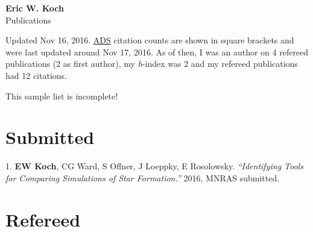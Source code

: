 \documentclass[letterpaper,11pt]{article}
\newcommand{\myname}{Eric W. Koch}
\newcommand{\mysite}{e-koch.github.io}
\newenvironment{publist}{
  \begingroup
  \raggedright
  \begin{description}[leftmargin=4ex,style=sameline]
}{
  \end{description}
  \endgroup
}
\begin{document}
\pagestyle{fancy}
\lhead{} \chead{} \rhead{} \renewcommand{\headrule}{\relax}
\cfoot{\thepage/\pageref*{LastPage}}
\rfoot{\textsc{\myname}}

\begin{center}
\textbf{\Large \myname} \\
{\large Publications}
\end{center}



\noindent Updated %
Nov 16, 2016.
\href{http://labs.adsabs.harvard.edu/adsabs}{ADS} citation counts are shown in square brackets and were last updated
around Nov 17, 2016. As of then, I was an author on 4
refereed publications (2 as first author), my \textit{h}-index was
2 and my refereed publications had 12 citations.

This sample list is incomplete!



\section*{Submitted}

\begin{publist}
\item[1.] \textbf{EW Koch}, CG Ward, S Offner, J Loeppky, E Rosolowsky. \textit{``Identifying Tools for Comparing Simulations of Star Formation.''} 2016, MNRAS submitted.
\end{publist}

\section*{Refereed}
\end{document}
